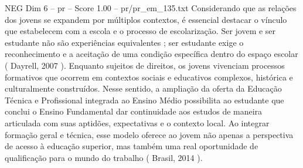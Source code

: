\begin{textsample}{NEG Dim 6 – pr – Score 1.00 – pr/pr\_em\_135.txt}
Considerando que as relações dos jovens se expandem por múltiplos contextos, é essencial destacar o vínculo que estabelecem com a escola e o processo de escolarização.
Ser jovem e ser estudante não são experiências equivalentes ; ser estudante exige o reconhecimento e a aceitação de uma condição específica dentro do espaço escolar ( Dayrell, 2007 ).
Enquanto sujeitos de direitos, os jovens vivenciam processos formativos que ocorrem em contextos sociais e educativos complexos, histórica e culturalmente construídos.
Nesse sentido, a ampliação da oferta da Educação Técnica e Profissional integrada ao Ensino Médio possibilita ao estudante que conclui o Ensino Fundamental dar continuidade aos estudos de maneira articulada com suas aptidões, expectativas e o contexto local.
Ao integrar formação geral e técnica, esse modelo oferece ao jovem não apenas a perspectiva de acesso à educação superior, mas também uma real oportunidade de qualificação para o mundo do trabalho ( Brasil, 2014 ).

\end{textsample}
